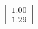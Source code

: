 \documentclass[preview]{standalone}
\begin{document}
\begin{align*}
\begin{bmatrix} 1.00 \\ 1.29 \end{bmatrix}
\end{align*}
\end{document}
